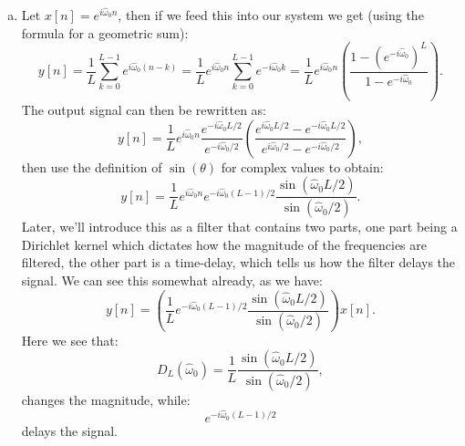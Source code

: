 \begin{enumerate}
\begin{enumerate}[a)]
          \item Let $x[n]=e^{i\hat{\omega}_{0}n}$, then if we feed this into our system we
                get (using the formula for a geometric sum):
                \[y[n]=\frac{1}{L}\sum_{k=0}^{L-1}e^{i\hat{\omega}_{0}(n-k)}=\frac{1}{L}e^{i\hat{\omega}_{0}n}\sum_{k=0}^{L-1}e^{-i\hat{\omega}_{0}k}
                  =\frac{1}{L}e^{i\hat{\omega}_{0}n}\left(\frac{1-(e^{-i\hat{\omega}_{0}})^{L}}{1-e^{-i\hat{\omega}_{0}}}\right).\]
                The output signal can then be rewritten as:
                \[ y[n] = \frac{1}{L}e^{i\hat{\omega}_{0}n}\frac{e^{-i\hat{\omega}_{0}L/2}}{e^{-i\hat{\omega}_{0}/2}}\left(\frac{e^{i\hat{\omega}_{0}L/2} - e^{-i\hat{\omega}_{0}L/2}}{e^{i\hat{\omega}_{0}/2} - e^{-i\hat{\omega}_{0}/2}}\right), \]
                then use the definition of $\sin(\theta)$ for complex values to obtain:
                \[ y[n] = \frac{1}{L}e^{i\hat{\omega}_{0}n}e^{-i\hat{\omega}_{0}(L - 1)/2}\frac{\sin(\hat{\omega}_{0}L/2)}{\sin(\hat{\omega}_{0}/2)}. \]
                Later, we'll introduce this as a filter that contains two parts,
                one part being a Dirichlet kernel which dictates how the magnitude of
                the frequencies are filtered, the other part is a time-delay, which tells us
                how the filter delays the signal. We can see this somewhat already, as we have:
                \[ y[n] = \left(\frac{1}{L}e^{-i\hat{\omega}_{0}(L - 1)/2}\frac{\sin(\hat{\omega}_{0}L/2)}{\sin(\hat{\omega}_{0}/2)}\right)x[n]. \]
                Here we see that:
                \[ D_{L}(\hat{\omega}_{0})=\frac{1}{L}\frac{\sin(\hat{\omega}_{0}L/2)}{\sin(\hat{\omega}_{0}/2)}, \]
                changes the magnitude, while:
                \[ e^{-i\hat{\omega}_{0}(L - 1)/2} \]
                delays the signal.


\end{enumerate}
\end{enumerate}
